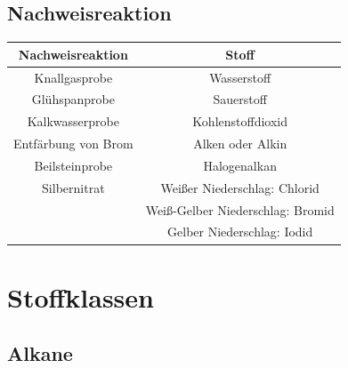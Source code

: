 \documentclass[a4paper]{article}
\begin{document}
\subsection{Nachweisreaktion}
\begin{center}
    \begin{tabular}{|c | c|} \hline
        \textbf{Nachweisreaktion} & \textbf{Stoff} \\ \hline
        Knallgasprobe &Wasserstoff \\
        Glühspanprobe &Sauerstoff \\
        Kalkwasserprobe &Kohlenstoffdioxid \\
        Entfärbung von Brom &Alken oder Alkin \\
        Beilsteinprobe & Halogenalkan \\ \hline
        Silbernitrat & Weißer Niederschlag: Chlorid \\
        \quad & Weiß-Gelber Niederschlag: Bromid \\
        \quad & Gelber Niederschlag: Iodid \\ \hline
    \end{tabular}
\end{center}



\section{Stoffklassen}
\subsection{Alkane}
\end{document}

